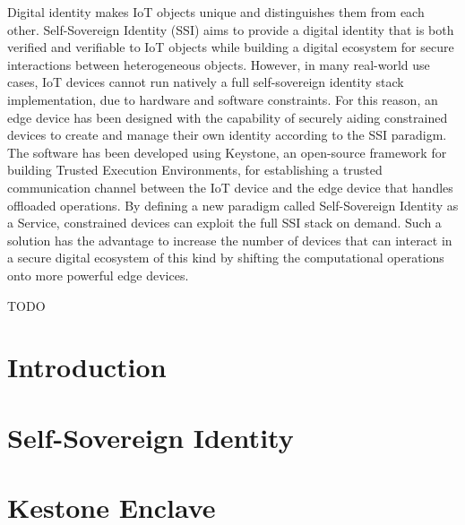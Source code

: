 \documentclass[pdfa%
,twoside%
,12pt%
]{toptesi}
\begin{document}
Digital identity makes IoT objects unique and distinguishes them from each other. Self-Sovereign Identity (SSI) aims to provide a digital identity that is both verified and verifiable to IoT objects while building a digital ecosystem for secure interactions between heterogeneous objects. However, in many real-world use cases, IoT devices cannot run natively a full self-sovereign identity stack implementation, due to hardware and software constraints. For this reason, an edge device has been designed with the capability of securely aiding constrained devices to create and manage their own identity according to the SSI paradigm. The software has been developed using Keystone, an open-source framework for building Trusted Execution Environments, for establishing a trusted communication channel between the IoT device and the edge device that handles offloaded operations. By defining a new paradigm called Self-Sovereign Identity as a Service, constrained devices can exploit the full SSI stack on demand. Such a solution has the advantage to increase the number of devices that can interact in a secure digital ecosystem of this kind by shifting the computational operations onto more powerful edge devices. 

\ringraziamenti

{\color{red} TODO}



\indici

\mainmatter

\chapter{Introduction}


\chapter{Self-Sovereign Identity}

\chapter{Kestone Enclave}

\end{document}
